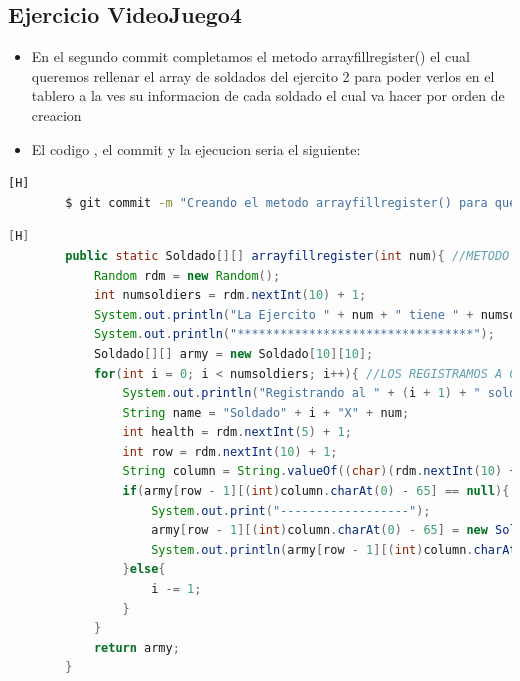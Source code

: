 \documentclass{article}
\begin{document}
	\subsection{Ejercicio VideoJuego4}
	\begin{itemize}	
		\item En el segundo commit completamos el metodo arrayfillregister() el cual queremos rellenar el array de soldados del ejercito 2 para poder verlos en el tablero a la ves su informacion de cada soldado el cual va hacer por orden de creacion
		\item El codigo , el commit y la ejecucion seria el siguiente:
	\end{itemize}	
	\begin{lstlisting}[language=bash,caption={Commit}][H]
		$ git commit -m "Creando el metodo arrayfillregister() para que este pueda imprimir los datos de los soldados que estan en el tablero este te devuelve el array lleno con la cantidad de soldados y texto que dice su informacion de cada soldado Y tambien cumplimos con el cual no se repita un soldado en el mismo casillero ya que al ver que este lleno este retrocedera una repeticion ya que estaria tomando la repeticion en un casillero lleno"
	\end{lstlisting}	
	\begin{lstlisting}[language=java,caption={Las lineas de codigos del metodo creado:}][H]
		public static Soldado[][] arrayfillregister(int num){ //METODO CREADO PARA PODER CREAR AL EJERCITO 2 EL CUAL USAREMOS LA ESTRUCTURA DE DATO QUE ES EL ARRAY CON TAL QUE TAMBIEN REGISTRAMOS 
			Random rdm = new Random();
			int numsoldiers = rdm.nextInt(10) + 1;
			System.out.println("La Ejercito " + num + " tiene " + numsoldiers + " soldados:");  
			System.out.println("*********************************");
			Soldado[][] army = new Soldado[10][10];
			for(int i = 0; i < numsoldiers; i++){ //LOS REGISTRAMOS A CADA UNO POR EL ORDEN DE CREACION QUE FUERON CREADOS EL CUAL TAMBIEN COMPLETAMOS SUS DATOS Y LOS PUBLICAMOS POR ORDEN 
				System.out.println("Registrando al " + (i + 1) + " soldado del Ejercito " + num + "");            
				String name = "Soldado" + i + "X" + num;            
				int health = rdm.nextInt(5) + 1;
				int row = rdm.nextInt(10) + 1;
				String column = String.valueOf((char)(rdm.nextInt(10) + 65));  
				if(army[row - 1][(int)column.charAt(0) - 65] == null){ //VERIFICAMOS QUE NO SE REPITAN MISMOS SOLDADOS DE UN EJERCITO EN EL MISMO CUADRADO 
					System.out.print("------------------");
					army[row - 1][(int)column.charAt(0) - 65] = new Soldado(name, health, row, column);
					System.out.println(army[row - 1][(int)column.charAt(0) - 65].toString());
				}else{
					i -= 1;
				}
			}
			return army;
    	}
	\end{lstlisting}
\end{document}
